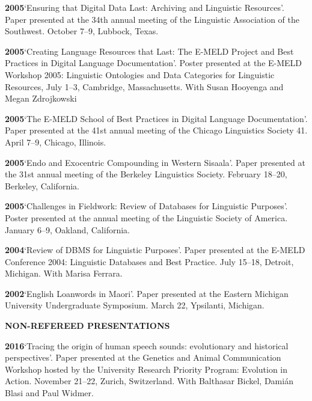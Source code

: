 \documentclass[11pt]{article}
\newcommand{\hangpara}{
 \setlength{\parindent}{0in} %
 \hangindent=0.42in %
}
\begin{document}
\vskip 6pt
\hangpara
{\bf 2005}\hspace{1ex}`Ensuring that Digital Data Last: Archiving and Linguistic Resources'. Paper presented at the 34th annual meeting of the Linguistic Association of the Southwest. October 7--9, Lubbock, Texas. 
 
\vskip 6pt
\hangpara
{\bf 2005}\hspace{1ex}`Creating Language Resources that Last: The E-MELD Project and Best Practices in Digital Language Documentation'. Poster presented at the E-MELD Workshop 2005: Linguistic Ontologies and Data Categories for Linguistic Resources, July 1--3, Cambridge, Massachusetts. With Susan Hooyenga and Megan Zdrojkowski

\vskip 6pt
\hangpara
{\bf 2005}\hspace{1ex}`The E-MELD School of Best Practices in Digital Language Documentation'. Paper presented at the 41st annual meeting of the Chicago Linguistics Society 41. April 7--9, Chicago, Illinois.

\vskip 6pt
\hangpara
{\bf 2005}\hspace{1ex}`Endo and Exocentric Compounding in Western Sisaala'. Paper presented at the 31st annual meeting of the Berkeley Linguistics Society. February 18--20, Berkeley, California.

\vskip 6pt
\hangpara
{\bf 2005}\hspace{1ex}`Challenges in Fieldwork: Review of Databases for Linguistic Purposes'. Poster presented at the annual meeting of the Linguistic Society of America. January 6--9, Oakland, California.

\vskip 6pt
\hangpara
{\bf 2004}\hspace{1ex}`Review of DBMS for Linguistic Purposes'. Paper presented at the E-MELD Conference 2004: Linguistic Databases and Best Practice. July 15--18, Detroit, Michigan. With Marisa Ferrara.

\vskip 6pt
\hangpara
{\bf 2002}\hspace{1ex}`English Loanwords in Maori'. Paper presented at the Eastern Michigan University Undergraduate Symposium. March 22, Ypsilanti, Michigan.


\vskip 20pt
\begin{flushleft}
{\bf NON-REFEREED PRESENTATIONS}
\end{flushleft}

\hangpara
{\bf 2016}\hspace{1ex}`Tracing the origin of human speech sounds: evolutionary and historical perspectives'. Paper presented at the Genetics and Animal Communication Workshop hosted by the University Research Priority Program: Evolution in Action. November 21--22, Zurich, Switzerland. With Balthasar Bickel, Dami{\'a}n Blasi and Paul Widmer.
\end{document}
